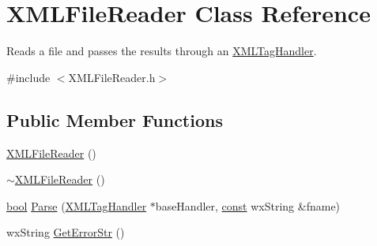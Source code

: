 \hypertarget{class_x_m_l_file_reader}{}\section{X\+M\+L\+File\+Reader Class Reference}
\label{class_x_m_l_file_reader}


Reads a file and passes the results through an \hyperlink{class_x_m_l_tag_handler}{X\+M\+L\+Tag\+Handler}.  




{\ttfamily \#include $<$X\+M\+L\+File\+Reader.\+h$>$}

\subsection*{Public Member Functions}
\begin{DoxyCompactItemize}
\item 
\hyperlink{class_x_m_l_file_reader_aae9f076e2d2e9daa0b3e7cbee45f1b3f}{X\+M\+L\+File\+Reader} ()
\item 
\hyperlink{class_x_m_l_file_reader_a64137b85170c1a7fcf96de3f57654e9c}{$\sim$\+X\+M\+L\+File\+Reader} ()
\item 
\hyperlink{mac_2config_2i386_2lib-src_2libsoxr_2soxr-config_8h_abb452686968e48b67397da5f97445f5b}{bool} \hyperlink{class_x_m_l_file_reader_a00c578f6fa3a9a883ef5ced465404642}{Parse} (\hyperlink{class_x_m_l_tag_handler}{X\+M\+L\+Tag\+Handler} $\ast$base\+Handler, \hyperlink{getopt1_8c_a2c212835823e3c54a8ab6d95c652660e}{const} wx\+String \&fname)
\item 
wx\+String \hyperlink{class_x_m_l_file_reader_a923720cb3b6e405d82ccfa8c71b4dc57}{Get\+Error\+Str} ()
\end{DoxyCompactItemize}
